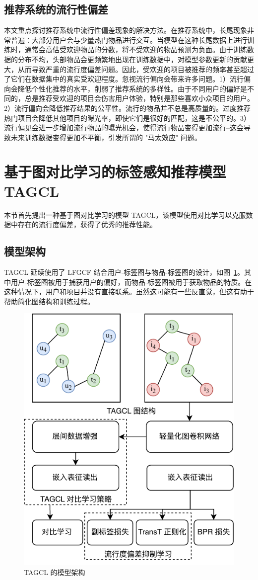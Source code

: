 \subsection{推荐系统的流行性偏差}
本文重点探讨推荐系统中流行性偏差现象的解决方法。在推荐系统中，长尾现象非常普遍：大部分用户会与少量热门物品进行交互。当模型在这种长尾数据上进行训练时，通常会高估受欢迎物品的分数，将不受欢迎的物品预测为负面。由于训练数据的分布不均，头部物品会更频繁地出现在训练数据中，对模型参数更新的贡献更大，从而导致严重的流行度偏差问题。因此，受欢迎的项目被推荐的频率甚至超过了它们在数据集中的真实受欢迎程度。忽视流行偏向会带来许多问题\cite{abdollahpouri_connection_2020}。1）流行偏向会降低个性化推荐的水平，削弱了推荐系统的多样性。由于不同用户的偏好是不同的，总是推荐受欢迎的项目会伤害用户体验，特别是那些喜欢小众项目的用户。2）流行偏向会降低推荐结果的公平性。流行的物品并不总是高质量的。过度推荐热门项目会降低其他项目的曝光率，即使它们是很好的匹配，这是不公平的。3）流行偏见会进一步增加流行物品的曝光机会，使得流行物品变得更加流行--这会导致未来训练数据变得更加不平衡，引发所谓的 "马太效应" 问题。

\section{基于图对比学习的标签感知推荐模型 TAGCL}
本节首先提出一种基于图对比学习的模型 TAGCL，该模型使用对比学习以克服数据中存在的流行度偏差，获得了优秀的推荐性能。

\subsection{模型架构}
TAGCL 延续使用了 LFGCF 结合用户-标签图与物品-标签图的设计，如图~\ref{fig:tagcal}。其中用户-标签图被用于捕获用户的偏好，而物品-标签图被用于获取物品的特质。在这种情况下，用户和项目并没有直接联系。虽然这可能有一些反直觉，但这有助于帮助简化图结构和训练过程。

\begin{figure}[!h]
    \centering
    \setlength{\belowcaptionskip}{-6mm}
    \includegraphics[width=.66\linewidth]{figure/tagcl.drawio.pdf}
    \caption{TAGCL 的模型架构}
    \label{fig:tagcal}
\end{figure}

